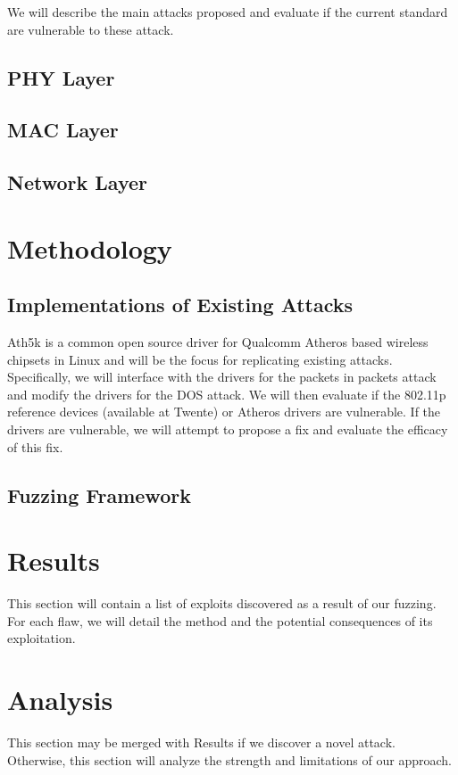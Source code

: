 \documentclass[conference]{IEEEtran}
\begin{document}
We will describe the main attacks proposed and evaluate if the current standard are vulnerable to these attack. 



\subsection{PHY Layer}


\subsection{MAC Layer}




\subsection{Network Layer}



\section{Methodology}
\subsection{ Implementations of Existing Attacks}
\label{sec:existing_attacks}
Ath5k is a common open source driver for Qualcomm Atheros based wireless chipsets in Linux and will be the focus for replicating existing attacks. Specifically, we will interface with the drivers for the packets in packets attack and modify the drivers for the DOS attack. We will then evaluate if the 802.11p reference devices (available at Twente) or Atheros drivers are vulnerable. If the drivers are vulnerable, we will attempt to propose a fix and evaluate the efficacy of this fix.\\

\subsection{Fuzzing Framework}


\section{Results}
This section will contain a list of exploits discovered as a result of our fuzzing. For each flaw, we will detail the method and the potential consequences of its exploitation.

\section{Analysis}
This section may be merged with Results if we discover a novel attack. Otherwise, this section will analyze the strength and limitations of our approach.
\end{document}
